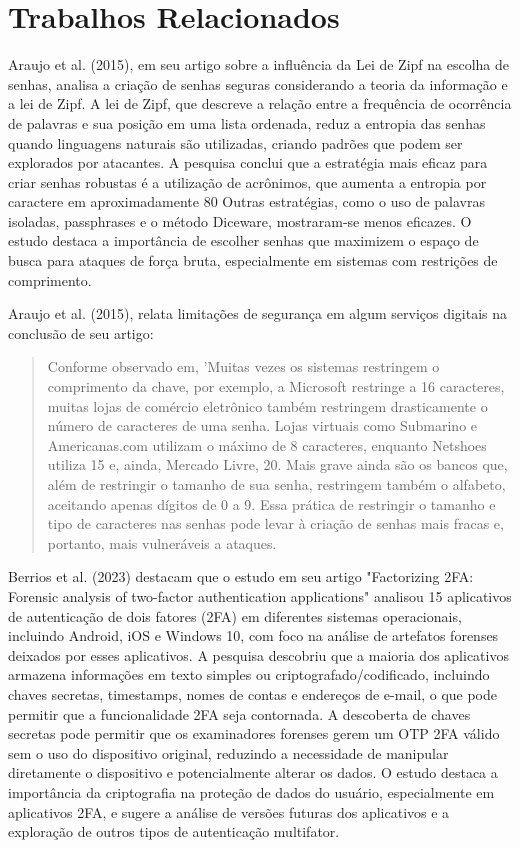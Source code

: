 \documentclass[12pt]{article}
\begin{document}
\section{Trabalhos Relacionados}

Araujo et al. (2015), em seu artigo sobre a influência da Lei de Zipf na
escolha de senhas, analisa a criação de senhas seguras considerando a
teoria da informação e a lei de Zipf.
A lei de Zipf, que descreve a relação entre a frequência de ocorrência de
palavras e sua posição em uma lista ordenada, reduz a entropia das senhas
quando linguagens naturais são utilizadas, criando padrões que podem ser
explorados por atacantes.
A pesquisa conclui que a estratégia mais eficaz para criar senhas robustas
é a utilização de acrônimos, que aumenta a entropia por caractere em
aproximadamente 80%
Outras estratégias, como o uso de palavras isoladas, passphrases e o
método Diceware, mostraram-se menos eficazes.
O estudo destaca a importância de escolher senhas que maximizem o espaço
de busca para ataques de força bruta, especialmente em sistemas com
restrições de comprimento.

Araujo et al. (2015), relata limitações de segurança em algum serviços
digitais na conclusão de seu artigo:
\begin{quote}
  Conforme observado em, 'Muitas vezes os sistemas restringem o comprimento da chave, por exemplo, a
  Microsoft restringe a 16 caracteres, muitas lojas de comércio eletrônico também restringem drasticamente o
  número de caracteres de uma senha. Lojas virtuais como Submarino e Americanas.com utilizam o máximo de 8
  caracteres, enquanto Netshoes utiliza 15 e, ainda, Mercado Livre, 20. Mais grave ainda são os bancos que,
  além de restringir o tamanho de sua senha, restringem também o alfabeto, aceitando apenas dígitos de 0 a 9.
  Essa prática de restringir o tamanho e tipo de caracteres nas senhas pode levar à criação de senhas mais
  fracas e, portanto, mais vulneráveis a ataques. \cite{araujo:2015}
\end{quote}

Berrios et al. (2023) destacam que o estudo em seu artigo "Factorizing 2FA:
Forensic analysis of two-factor authentication applications" analisou 15
aplicativos de autenticação de dois fatores (2FA) em diferentes sistemas
operacionais, incluindo Android, iOS e Windows 10, com foco na análise de
artefatos forenses deixados por esses aplicativos.
A pesquisa descobriu que a maioria dos aplicativos armazena informações em
texto simples ou criptografado/codificado, incluindo chaves secretas,
timestamps, nomes de contas e endereços de e-mail, o que pode permitir que
a funcionalidade 2FA seja contornada.
A descoberta de chaves secretas pode permitir que os examinadores forenses
gerem um OTP 2FA válido sem o uso do dispositivo original, reduzindo a
necessidade de manipular diretamente o dispositivo e potencialmente alterar
os dados.
O estudo destaca a importância da criptografia na proteção de dados do
usuário, especialmente em aplicativos 2FA, e sugere a análise de versões
futuras dos aplicativos e a exploração de outros tipos de autenticação
multifator.
\end{document}
